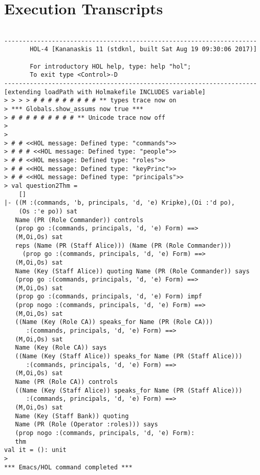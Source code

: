 \documentclass{report}
\begin{document}



\section{Execution Transcripts}
\label{sec:exec-transcr-2}

\setcounter{sessioncount}{0}
\begin{session}
  \begin{scriptsize}
\begin{verbatim}

---------------------------------------------------------------------
       HOL-4 [Kananaskis 11 (stdknl, built Sat Aug 19 09:30:06 2017)]

       For introductory HOL help, type: help "hol";
       To exit type <Control>-D
---------------------------------------------------------------------
[extending loadPath with Holmakefile INCLUDES variable]
> > > > # # # # # # # # # ** types trace now on
> *** Globals.show_assums now true ***
> # # # # # # # # # ** Unicode trace now off
> 
> 
> # # <<HOL message: Defined type: "commands">>
> # # # <<HOL message: Defined type: "people">>
> # # <<HOL message: Defined type: "roles">>
> # # <<HOL message: Defined type: "keyPrinc">>
> # # <<HOL message: Defined type: "principals">>
> val question2Thm =
    []
|- ((M :(commands, 'b, principals, 'd, 'e) Kripke),(Oi :'d po),
    (Os :'e po)) sat
   Name (PR (Role Commander)) controls
   (prop go :(commands, principals, 'd, 'e) Form) ==>
   (M,Oi,Os) sat
   reps (Name (PR (Staff Alice))) (Name (PR (Role Commander)))
     (prop go :(commands, principals, 'd, 'e) Form) ==>
   (M,Oi,Os) sat
   Name (Key (Staff Alice)) quoting Name (PR (Role Commander)) says
   (prop go :(commands, principals, 'd, 'e) Form) ==>
   (M,Oi,Os) sat
   (prop go :(commands, principals, 'd, 'e) Form) impf
   (prop nogo :(commands, principals, 'd, 'e) Form) ==>
   (M,Oi,Os) sat
   ((Name (Key (Role CA)) speaks_for Name (PR (Role CA)))
      :(commands, principals, 'd, 'e) Form) ==>
   (M,Oi,Os) sat
   Name (Key (Role CA)) says
   ((Name (Key (Staff Alice)) speaks_for Name (PR (Staff Alice)))
      :(commands, principals, 'd, 'e) Form) ==>
   (M,Oi,Os) sat
   Name (PR (Role CA)) controls
   ((Name (Key (Staff Alice)) speaks_for Name (PR (Staff Alice)))
      :(commands, principals, 'd, 'e) Form) ==>
   (M,Oi,Os) sat
   Name (Key (Staff Bank)) quoting
   Name (PR (Role (Operator :roles))) says
   (prop nogo :(commands, principals, 'd, 'e) Form):
   thm
val it = (): unit
> 
*** Emacs/HOL command completed ***

\end{verbatim}
  \end{scriptsize}
\end{session}
\end{document}
